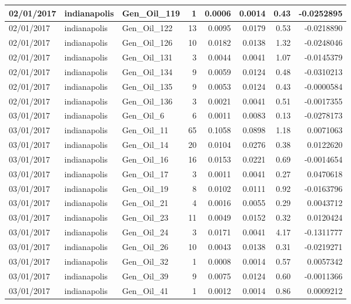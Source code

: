 \documentclass[
  letterpaper,
  DIV=11,
  numbers=noendperiod]{scrartcl}
\begin{document}
\begin{tabular}{l|l|l|r|r|r|r|r}
\hline
02/01/2017 & indianapolis & Gen\_Oil\_119 & 1 & 0.0006 & 0.0014 & 0.43 & -0.0252895\\
\hline
02/01/2017 & indianapolis & Gen\_Oil\_122 & 13 & 0.0095 & 0.0179 & 0.53 & -0.0218890\\
\hline
02/01/2017 & indianapolis & Gen\_Oil\_126 & 10 & 0.0182 & 0.0138 & 1.32 & -0.0248046\\
\hline
02/01/2017 & indianapolis & Gen\_Oil\_131 & 3 & 0.0044 & 0.0041 & 1.07 & -0.0145379\\
\hline
02/01/2017 & indianapolis & Gen\_Oil\_134 & 9 & 0.0059 & 0.0124 & 0.48 & -0.0310213\\
\hline
02/01/2017 & indianapolis & Gen\_Oil\_135 & 9 & 0.0053 & 0.0124 & 0.43 & -0.0000584\\
\hline
02/01/2017 & indianapolis & Gen\_Oil\_136 & 3 & 0.0021 & 0.0041 & 0.51 & -0.0017355\\
\hline
03/01/2017 & indianapolis & Gen\_Oil\_6 & 6 & 0.0011 & 0.0083 & 0.13 & -0.0278173\\
\hline
03/01/2017 & indianapolis & Gen\_Oil\_11 & 65 & 0.1058 & 0.0898 & 1.18 & 0.0071063\\
\hline
03/01/2017 & indianapolis & Gen\_Oil\_14 & 20 & 0.0104 & 0.0276 & 0.38 & 0.0122620\\
\hline
03/01/2017 & indianapolis & Gen\_Oil\_16 & 16 & 0.0153 & 0.0221 & 0.69 & -0.0014654\\
\hline
03/01/2017 & indianapolis & Gen\_Oil\_17 & 3 & 0.0011 & 0.0041 & 0.27 & 0.0470618\\
\hline
03/01/2017 & indianapolis & Gen\_Oil\_19 & 8 & 0.0102 & 0.0111 & 0.92 & -0.0163796\\
\hline
03/01/2017 & indianapolis & Gen\_Oil\_21 & 4 & 0.0016 & 0.0055 & 0.29 & 0.0043712\\
\hline
03/01/2017 & indianapolis & Gen\_Oil\_23 & 11 & 0.0049 & 0.0152 & 0.32 & 0.0120424\\
\hline
03/01/2017 & indianapolis & Gen\_Oil\_24 & 3 & 0.0171 & 0.0041 & 4.17 & -0.1311777\\
\hline
03/01/2017 & indianapolis & Gen\_Oil\_26 & 10 & 0.0043 & 0.0138 & 0.31 & -0.0219271\\
\hline
03/01/2017 & indianapolis & Gen\_Oil\_32 & 1 & 0.0008 & 0.0014 & 0.57 & 0.0057342\\
\hline
03/01/2017 & indianapolis & Gen\_Oil\_39 & 9 & 0.0075 & 0.0124 & 0.60 & -0.0011366\\
\hline
03/01/2017 & indianapolis & Gen\_Oil\_41 & 1 & 0.0012 & 0.0014 & 0.86 & 0.0009212\\

\end{tabular}
\end{document}
